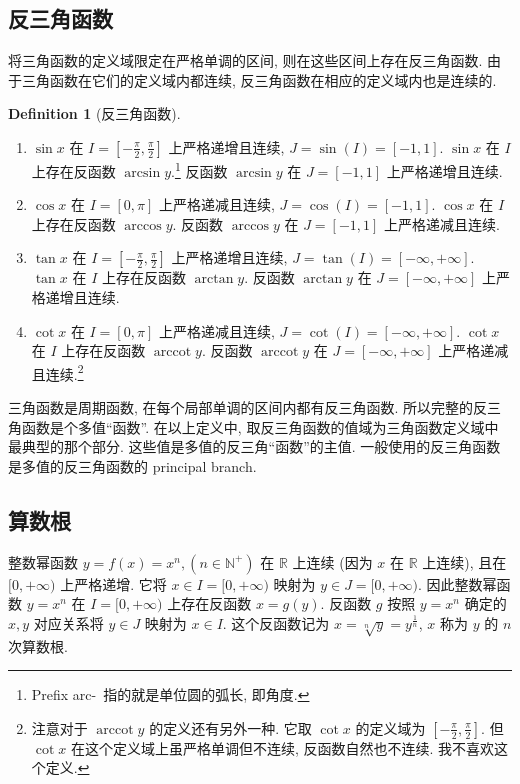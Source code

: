\documentclass{book}
\newcommand{\R}{\mathbb{R}}
\newcommand{\N}{\mathbb{N}}
\DeclareMathOperator{\arccot}{arccot}
\numberwithin{equation}{section}
\numberwithin{figure}{section}
\theoremstyle{definition}
\newtheorem{definition}{Definition}
\begin{document}
\subsection{反三角函数}
   将三角函数的定义域限定在严格单调的区间, 则在这些区间上存在反三角函数. 由于三角函数在它们的定义域内都连续, 反三角函数在相应的定义域内也是连续的.
\begin{definition}[反三角函数]
  \leavevmode

  \begin{enumerate}
    \item $\sin x$ 在 $I=\left[-\frac{\pi}{2},\frac{\pi}{2}\right]$ 上严格递增且连续, $J=\sin(I)=[-1,1]$. $\sin x$ 在 $I$ 上存在反函数 $\arcsin y$.\footnote{Prefix arc-\ 指的就是单位圆的弧长, 即角度.} 反函数 $\arcsin y$ 在 $J=[-1,1]$ 上严格递增且连续.
    \item $\cos x$ 在 $I=\left[0,\pi\right]$ 上严格递减且连续, $J=\cos(I)=[-1,1]$. $\cos x$ 在 $I$ 上存在反函数 $\arccos y$. 反函数 $\arccos y$ 在 $J=[-1,1]$ 上严格递减且连续.
    \item $\tan x$ 在 $I=\left[-\frac{\pi}{2},\frac{\pi}{2}\right]$ 上严格递增且连续, $J=\tan(I)=[-\infty,+\infty]$. $\tan x$ 在 $I$ 上存在反函数 $\arctan y$. 反函数 $\arctan y$ 在 $J=[-\infty,+\infty]$ 上严格递增且连续.
    \item $\cot x$ 在 $I=\left[0,\pi\right]$ 上严格递减且连续, $J=\cot(I)=[-\infty,+\infty]$. $\cot x$ 在 $I$ 上存在反函数 $\arccot y$. 反函数 $\arccot y$ 在 $J=[-\infty,+\infty]$ 上严格递减且连续.\footnote{注意对于 $\arccot y$ 的定义还有另外一种. 它取 $\cot x$ 的定义域为 $\left[ -\frac{\pi}{2},\frac{\pi}{2} \right]$. 但 $\cot x$ 在这个定义域上虽严格单调但不连续, 反函数自然也不连续. 我不喜欢这个定义.}
  \end{enumerate}
\end{definition}
三角函数是周期函数, 在每个局部单调的区间内都有反三角函数. 所以完整的反三角函数是个多值``函数''. 在以上定义中, 取反三角函数的值域为三角函数定义域中最典型的那个部分. 这些值是多值的反三角``函数''的主值. 一般使用的反三角函数是多值的反三角函数的 principal branch.
\subsection{算数根}
整数幂函数 $y=f(x)=x^n,(n\in\N^+)$ 在 $\R$ 上连续 (因为 $x$ 在 $\R$ 上连续), 且在 $[0,+\infty)$ 上严格递增.
它将 $x\in I=[0,+\infty)$ 映射为 $y\in J=[0,+\infty)$. 因此整数幂函数 $y=x^n$ 在 $I=[0,+\infty)$ 上存在反函数 $x=g(y)$. 反函数 $g$ 按照 $y=x^n$ 确定的 $x,y$ 对应关系将 $y\in J$ 映射为 $x\in I$. 这个反函数记为 $x=\sqrt[n]{y}=y^{\frac{1}{n}}$, $x$ 称为 $y$ 的 $n$ 次算数根.
\end{document}
